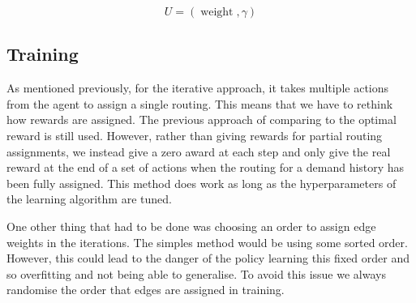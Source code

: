 \begin{equation}
  \label{equation:global_outputs}
  U = (\operatorname{weight}, \gamma)
\end{equation}

\subsection{Training}
As mentioned previously, for the iterative approach, it takes multiple actions from the agent to assign a single routing. This means that we have to rethink how rewards are assigned. The previous approach of comparing to the optimal reward is still used. However, rather than giving rewards for partial routing assignments, we instead give a zero award at each step and only give the real reward at the end of a set of actions when the routing for a demand history has been fully assigned. This method does work as long as the hyperparameters of the learning algorithm are tuned.

One other thing that had to be done was choosing an order to assign edge weights in the iterations. The simples method would be using some sorted order. However, this could lead to the danger of the policy learning this fixed order and so overfitting and not being able to generalise. To avoid this issue we always randomise the order that edges are assigned in training.

